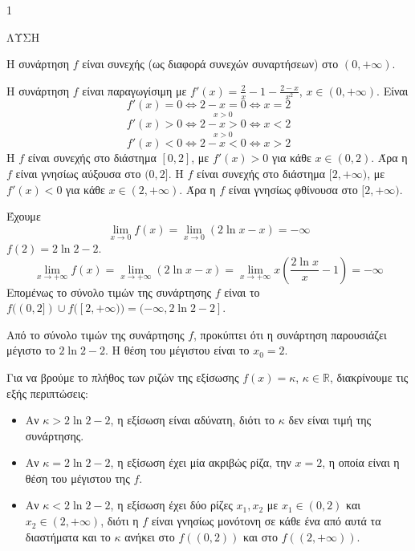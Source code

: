 \begin{ylh}{1}
    \item [Ύλη από εικόνα]
\end{ylh}
ΛΥΣΗ

\begin{alist}
\item Η συνάρτηση $f$ είναι συνεχής (ως διαφορά συνεχών συναρτήσεων) στο $(0, +\infty)$.
\begin{rlist}
\item Η συνάρτηση $f$ είναι παραγωγίσιμη με $f'(x) = \frac{2}{x} - 1 - \frac{2-x}{x^2}$, $x \in (0, +\infty)$.
   Είναι
   \[ f'(x) = 0 \Leftrightarrow 2 - x = 0 \Leftrightarrow x = 2 \]
   \[ f'(x) > 0 \Leftrightarrow \overset{x > 0}{2 - x > 0} \Leftrightarrow x < 2 \]
   \[ f'(x) < 0 \Leftrightarrow \overset{x > 0}{2 - x < 0} \Leftrightarrow x > 2 \]
   Η $f$ είναι συνεχής στο διάστημα $[0,2]$, με $f'(x) > 0$ για κάθε $x \in (0,2)$.
   Άρα η $f$ είναι γνησίως αύξουσα στο $(0,2]$.
   Η $f$ είναι συνεχής στο διάστημα $[2,+\infty)$, με $f'(x) < 0$ για κάθε $x \in (2,+\infty)$.
   Άρα η $f$ είναι γνησίως φθίνουσα στο $[2,+\infty)$.

\item Έχουμε
   \[ \lim_{x \to 0} f(x) = \lim_{x \to 0} (2 \ln x - x) = -\infty \]
   $f(2) = 2 \ln 2 - 2$.
   \[ \lim_{x \to +\infty} f(x) = \lim_{x \to +\infty} (2 \ln x - x) = \lim_{x \to +\infty} x \left( \frac{2 \ln x}{x} - 1 \right) = -\infty \]
   Επομένως το σύνολο τιμών της συνάρτησης $f$ είναι το $f((0,2]) \cup f([2,+\infty)) = (-\infty, 2 \ln 2 - 2]$.

\item Από το σύνολο τιμών της συνάρτησης $f$, προκύπτει ότι η συνάρτηση παρουσιάζει μέγιστο το $2 \ln 2 - 2$. Η θέση του μέγιστου είναι το $x_0 = 2$.
\end{rlist}

\item Για να βρούμε το πλήθος των ριζών της εξίσωσης $f(x) = \kappa$, $\kappa \in \mathbb{R}$, διακρίνουμε τις εξής περιπτώσεις:
\begin{itemize}
    \item[$\blacktriangleright$] Αν $\kappa > 2 \ln 2 - 2$, η εξίσωση είναι αδύνατη, διότι το $\kappa$ δεν είναι τιμή της συνάρτησης.
    \item[$\blacktriangleright$] Αν $\kappa = 2 \ln 2 - 2$, η εξίσωση έχει μία ακριβώς ρίζα, την $x = 2$, η οποία είναι η θέση του μέγιστου της $f$.
    \item[$\blacktriangleright$] Αν $\kappa < 2 \ln 2 - 2$, η εξίσωση έχει δύο ρίζες $x_1, x_2$ με $x_1 \in (0,2)$ και $x_2 \in (2,+\infty)$, διότι η $f$ είναι γνησίως μονότονη σε κάθε ένα από αυτά τα διαστήματα και το $\kappa$ ανήκει στο $f((0,2))$ και στο $f((2,+\infty))$.
\end{itemize}
\end{alist}